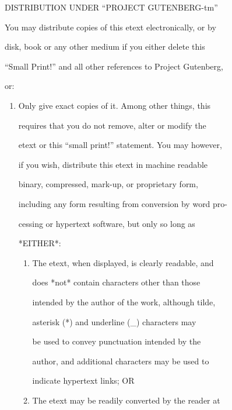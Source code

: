 \documentclass[12pt]{book}
\begin{document}
\begin{center}

DISTRIBUTION UNDER ``PROJECT GUTENBERG-tm''

\end{center}



You may distribute copies of this etext electronically, or by

disk, book or any other medium if you either delete this

``Small Print!'' and all other references to Project Gutenberg,

or:



\begin{enumerate}

\item  Only give exact copies of it.  Among other things, this

     requires that you do not remove, alter or modify the

     etext or this ``small print!'' statement.  You may however,

     if you wish, distribute this etext in machine readable

     binary, compressed, mark-up, or proprietary form,

     including any form resulting from conversion by word pro-

     cessing or hypertext software, but only so long as

     *EITHER*:

\begin{enumerate}

\item     The etext, when displayed, is clearly readable, and

          does *not* contain characters other than those

          intended by the author of the work, although tilde,

          asterisk (*) and underline (\_) characters may

          be used to convey punctuation intended by the

          author, and additional characters may be used to

          indicate hypertext links; OR



\item     The etext may be readily converted by the reader at


\end{enumerate}
\end{enumerate}
\end{document}
